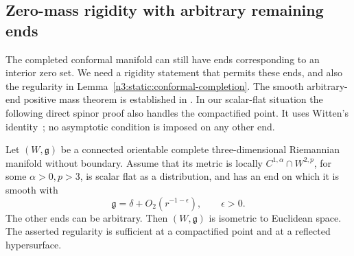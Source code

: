 \subsection{Zero-mass rigidity with arbitrary remaining ends}
\label{n3:static:spin-subsection}

The completed conformal manifold can still have ends corresponding
to an interior zero set. We need a rigidity statement that permits
these ends, and also the regularity in
Lemma~\ref{n3:static:conformal-completion}.
The smooth arbitrary-end positive mass theorem is established in
\cite[Theorem B]{CecchiniZeidler2024}.
In our scalar-flat situation the following direct spinor proof also
handles the compactified point. It uses Witten's
identity~\cite{Witten1981}; no asymptotic condition is imposed on any
other end.

\begin{lemma}
\label{n3:static:spin-rigidity}
Let \((W,\mathfrak g)\) be a connected orientable complete
three-dimensional Riemannian manifold without boundary.
Assume that its metric is locally \(C^{1,\alpha}\cap W^{2,p}\),
for some \(\alpha>0,p>3\), is scalar flat as a distribution,
and has an end on which it is smooth with
\[
\mathfrak g=\delta+O_2(r^{-1-\epsilon}),\qquad \epsilon>0.
\]
The other ends can be arbitrary.
Then \((W,\mathfrak g)\) is isometric to Euclidean space.
The asserted regularity is sufficient at a compactified point and
at a reflected hypersurface.
\end{lemma}

